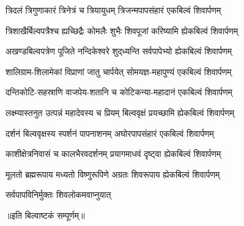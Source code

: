 
\twolineshloka
{त्रिदलं त्रिगुणाकारं त्रिनेत्रं च त्रियायुधम्}
{त्रिजन्मपापसंहारं एकबिल्वं शिवार्पणम्}%

\twolineshloka
{त्रिशाखैर्बिल्वपत्रैश्च ह्यच्छिद्रैः कोमलैः शुभैः}
{शिवपूजां करिष्यामि ह्येकबिल्वं शिवार्पणम्}%

\twolineshloka
{अखण्डबिल्वपत्रेण पूजिते नन्दिकेश्वरे}
{शुद्‌ध्यन्ति सर्वपापेभ्यो ह्येकबिल्वं शिवार्पणम्}%

\twolineshloka
{शालिग्राम-शिलामेकां विप्राणां जातु चार्पयेत्}
{सोमयज्ञ-महापुण्यं एकबिल्वं शिवार्पणम्}%

\twolineshloka
{दन्तिकोटि-सहस्राणि वाजपेय-शतानि च}
{कोटिकन्या-महादानं एकबिल्वं शिवार्पणम्}%

\twolineshloka
{लक्ष्म्यास्तनुत उत्पन्नं महादेवस्य च प्रियम्}
{बिल्ववृक्षं प्रयच्छामि ह्येकबिल्वं शिवार्पणम्}%

\twolineshloka
{दर्शनं बिल्ववृक्षस्य स्पर्शनं पापनाशनम्}
{अघोरपापसंहारं एकबिल्वं शिवार्पणम्}%

\twolineshloka
{काशीक्षेत्रनिवासं च कालभैरवदर्शनम्}
{प्रयागमाधवं दृष्ट्वा ह्येकबिल्वं शिवार्पणम्}%

\twolineshloka
{मूलतो ब्रह्मरूपाय मध्यतो विष्णुरूपिणे}
{अग्रतः शिवरूपाय ह्येकबिल्वं शिवार्पणम्}%

{सर्वपापविनिर्मुक्तः शिवलोकमवाप्नुयात्}%

{॥इति बिल्वाष्टकं सम्पूर्णम्॥}